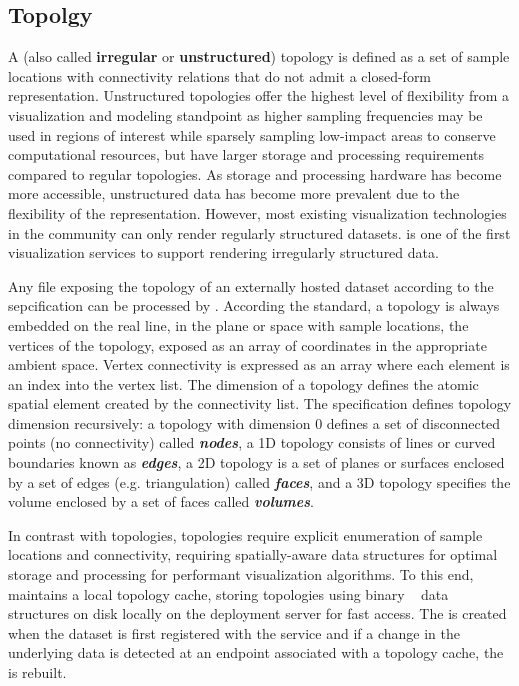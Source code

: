 \subsection{\ugrid{} Topolgy}
A \ugrid{} (also called {\bf irregular} or {\bf unstructured})
topology is defined as a set of sample locations with connectivity
relations that do not admit a closed-form representation. Unstructured
topologies offer the highest level of flexibility from a visualization
and modeling standpoint as higher sampling frequencies may be used in
regions of interest while sparsely sampling low-impact areas to
conserve computational resources, but have larger storage and
processing requirements compared to regular topologies. As storage and
processing hardware has become more accessible, unstructured data has
become more prevalent due to the flexibility of the
representation. However, most existing visualization technologies in
the \cf{} community can only render regularly structured
datasets. \sciwms{} is one of the first visualization services to
support rendering irregularly structured data.

Any \ncml{} file exposing the topology of an externally hosted dataset
according to the \cfugrid{} sepcification can be processed by
\sciwms{}. According the \cfugrid{} standard, a topology is always
embedded on the real line, in the plane or space with sample
locations, the vertices of the topology, exposed as an array of
coordinates in the appropriate ambient space. Vertex connectivity is
expressed as an array where each element is an index into the vertex
list. The dimension of a topology defines the atomic spatial element
created by the connectivity list. The \cfugrid{} specification defines
topology dimension recursively: a topology with dimension 0 defines a
set of disconnected points (no connectivity) called
\textbf{\textit{nodes}}, a 1D topology consists of lines or curved
boundaries known as \textbf{\textit{edges}}, a 2D topology is a set of
planes or surfaces enclosed by a set of edges (e.g. triangulation)
called \textbf{\textit{faces}}, and a 3D topology specifies the volume
enclosed by a set of faces called \textbf{\textit{volumes}}.

In contrast with \cgrid{} topologies, \ugrid{} topologies require
explicit enumeration of sample locations and connectivity, requiring
spatially-aware data structures for optimal storage and processing for
performant visualization algorithms. To this end, \sciwms{} maintains
a local topology cache, storing \ugrid{} topologies using binary
\rtree{}~\cite{Guttman84} data structures on disk locally on the
deployment server for fast access. The \rtree{} is created when the
dataset is first registered with the \sciwms{} service and if a change
in the underlying data is detected at an endpoint associated with a
topology cache, the \rtree{} is rebuilt.
